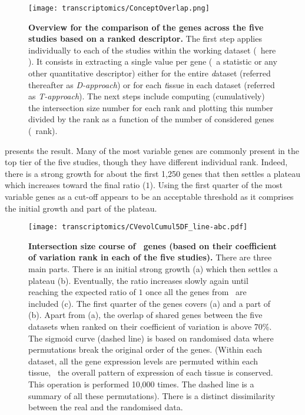 \begin{figure}[!htb]
    \texttt{[image: transcriptomics/ConceptOverlap.png]}\centering
    \caption[Overview for the comparison of the genes across the five
    studies based on a ranked descriptor 5 studies]{\label{fig:overlapConcept}%
    \textbf{Overview for the comparison of the genes across the five
    studies based on a ranked descriptor.}
    The first step applies individually to each of the studies
    within the working dataset (\ie\ here \setOne).
    It consists in extracting a single value per gene
    (\eg\ a statistic or any other quantitative descriptor)
    either for the entire \emph{d}ataset (referred thereafter as \emph{D-approach}) or
    for each \emph{t}issue in each dataset (referred as \emph{T-approach}).
    The next steps include
    computing (cumulatively) the intersection size number for each rank
    and plotting this number divided by the rank
    as a function of the number of considered genes (\ie\ rank).}
\end{figure}

 presents the result.
Many of the most variable genes are commonly present in the top tier of the
five studies, though they have different individual rank.
Indeed, there is a strong growth for about the first 1,250 genes that then
settles a plateau which increases toward the final ratio ($1$).
Using the first quarter of the most variable genes as a cut-off appears
to be an acceptable threshold
as it comprises the initial growth and part of the plateau.\mybr\

\begin{figure}[!htb]
    \texttt{[image: transcriptomics/CVevolCumul5DF\_line-abc.pdf]}\centering
    \vspace{-0.15in}
    \caption[Intersection size of \setOne\ genes (ranked by cv)]%
    {\label{fig:cvEvol5DF}\textbf{Intersection size course
    of \setOne\ genes (based on their coefficient of variation rank
    in each of the five studies).}
    There are three main parts.
    There is an initial strong growth (a)
    which then settles a plateau (b).
    Eventually, the ratio increases slowly again
    until reaching the expected ratio of $1$ once all the genes from \setOne\
    are included (c).
    The first quarter of the genes covers (a) and a part of (b).
    Apart from (a),
    the overlap of shared genes between the five datasets when ranked on their
    coefficient of variation is above 70\%.
    The sigmoid curve (dashed line) is based on randomised data
    where permutations break the original order of the genes. (Within each dataset,
    all the gene expression levels are permuted within each tissue,
    \ie\ the overall pattern of expression of each tissue is conserved.
    This operation is performed 10,000 times.
    The dashed line is a summary of all these permutations).
    There is a distinct dissimilarity between the real and the randomised data.}
\end{figure}


